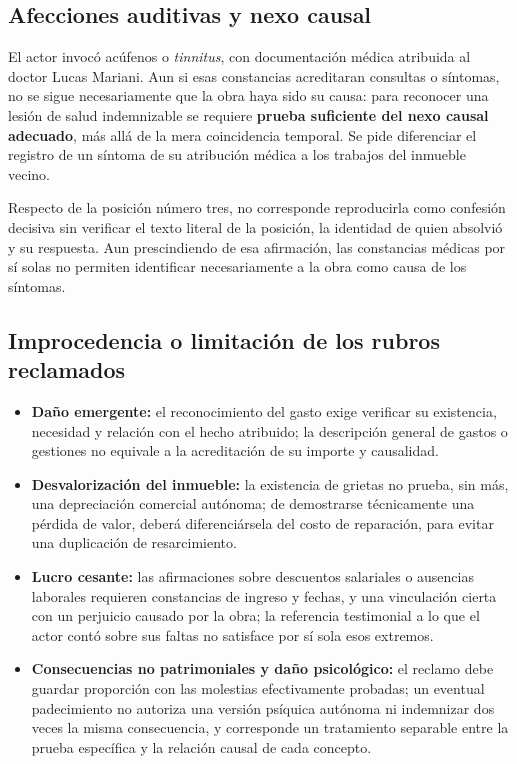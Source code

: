 \documentclass[12pt,oneside]{book}
\begin{document}
\subsection{Afecciones auditivas y nexo causal}

El actor invoc\'o ac\'ufenos o \emph{tinnitus}, con documentaci\'on m\'edica atribuida al doctor Lucas Mariani. Aun si esas constancias acreditaran consultas o s\'intomas, no se sigue necesariamente que la obra haya sido su causa: para reconocer una lesi\'on de salud indemnizable se requiere \textbf{prueba suficiente del nexo causal adecuado}, m\'as all\'a de la mera coincidencia temporal. Se pide diferenciar el registro de un s\'intoma de su atribuci\'on m\'edica a los trabajos del inmueble vecino.

Respecto de la posici\'on n\'umero tres, no corresponde reproducirla como confesi\'on decisiva sin verificar el texto literal de la posici\'on, la identidad de quien absolvi\'o y su respuesta. Aun prescindiendo de esa afirmaci\'on, las constancias m\'edicas por s\'i solas no permiten identificar necesariamente a la obra como causa de los s\'intomas.

\subsection{Improcedencia o limitaci\'on de los rubros reclamados}

\begin{itemize}
    \item \textbf{Da\~no emergente:} el reconocimiento del gasto exige verificar su existencia, necesidad y relaci\'on con el hecho atribuido; la descripci\'on general de gastos o gestiones no equivale a la acreditaci\'on de su importe y causalidad.
    \item \textbf{Desvalorizaci\'on del inmueble:} la existencia de grietas no prueba, sin m\'as, una depreciaci\'on comercial aut\'onoma; de demostrarse t\'ecnicamente una p\'erdida de valor, deber\'a diferenci\'arsela del costo de reparaci\'on, para evitar una duplicaci\'on de resarcimiento.
    \item \textbf{Lucro cesante:} las afirmaciones sobre descuentos salariales o ausencias laborales requieren constancias de ingreso y fechas, y una vinculaci\'on cierta con un perjuicio causado por la obra; la referencia testimonial a lo que el actor cont\'o sobre sus faltas no satisface por s\'i sola esos extremos.
    \item \textbf{Consecuencias no patrimoniales y da\~no psicol\'ogico:} el reclamo debe guardar proporci\'on con las molestias efectivamente probadas; un eventual padecimiento no autoriza una versi\'on ps\'iquica aut\'onoma ni indemnizar dos veces la misma consecuencia, y corresponde un tratamiento separable entre la prueba espec\'ifica y la relaci\'on causal de cada concepto.
\end{itemize}
\end{document}
